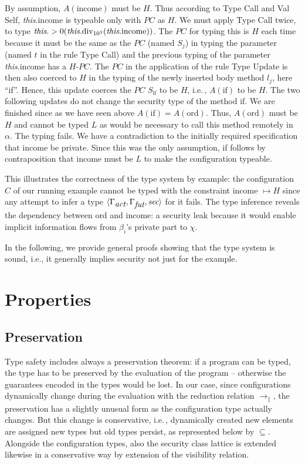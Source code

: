 \documentclass[10pt, conference, compsocconf]{IEEEtran}
\newcommand{\symb}[1]{\makebox{\it #1}}
\newcommand\dist{\ensuremath{\to_\|}}
\newcommand\ie{i.e.\!\,, }
\begin{document}
{By assumption, $A(\text{income})$ must be $H$. Thus
according to {\sc Type Call} and {\sc Val Self}, {\it this}.income is typeable 
only with $PC$ as $H$. We must apply {\sc Type Call} twice, to type
$\symb{this}.>0(\symb{this}.\text{div}_{10^3}(\symb{this}.\text{income}))$.
The $PC$ for typing this is $H$ each time because it must be the 
same as the $PC$ (named $S_j$) in typing the parameter (named $t$ in the 
rule {\sc Type Call}) and the previous typing of the parameter 
{\it this}.income has a $H$-$PC$.
The $PC$ in the application of the rule {\sc Type Update} is then also coerced
to $H$ in the typing of the newly inserted body method $l_j$, here ``if''. 
Hence, this update coerces the $PC$ $S_{\text{if}}$ to be $H$, \ie 
$A(\text{if})$ to be $H$. 
The two following updates do not change the security type of the method if.
We are finished since as we have seen above 
$A(\text{if}) = A(\text{ord})$. Thus, $A(\text{ord})$ must be $H$ and cannot be
typed $L$ as would be necessary to call this method remotely in $\alpha$.
The typing fails. We have a contradiction to the initially required specification 
that income be private. Since this was the only assumption, if follows by contraposition
that income must be $L$ to make the configuration typeable.

This illustrates the correctness of the type system by example: the configuration $C$ of 
our running example cannot be typed with the constraint income $\mapsto H$ since any 
attempt to infer a type $\langle \Gamma_{\symb{act}}, \Gamma_{\symb{fut}}, \symb{sec} \rangle$ 
for it fails.
The type inference reveals the dependency between ord and income: a security
leak because it would enable implicit information flows from $\beta_i$'s private part to
$\chi$.

In the following, we provide general proofs showing that the type system is sound, i.e., it
generally implies security not just for the example.


\section{Properties}
\label{sec:props}

\subsection{Preservation}
Type safety includes always a preservation theorem: if a program can be typed,
the type has to be preserved by the evaluation of the program -- otherwise the guarantees
encoded in the types would be lost. In our case, since configurations dynamically change during the
evaluation with the reduction relation $\dist$, the preservation has a slightly unusual form as the 
configuration type actually changes. But this change is conservative, \ie dynamically
created new elements are assigned new types but old types persist, as represented below 
by $\subseteq$.
Alongside the configuration types, also the security class lattice is extended likewise
in a conservative way by extension of the visibility relation.

}
\end{document}
